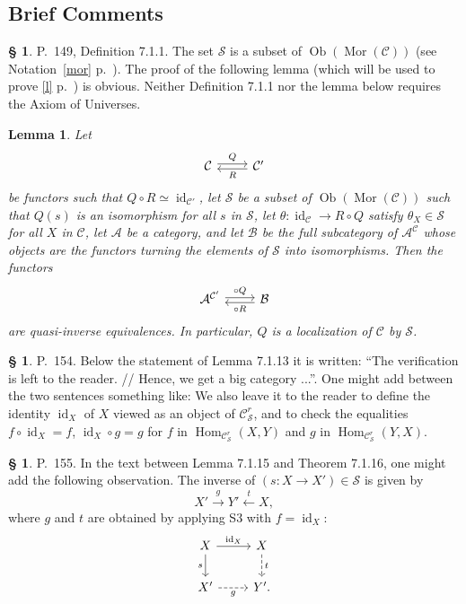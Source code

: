 \documentclass[12pt]{article}%
\newtheorem{lem}[thm]{Lemma}
\theoremstyle{remark}
\theoremstyle{definition}
\newtheorem{s}[thm]{\S}%
\newcommand{\cc}{\mathcal}
\newcommand{\A}{\mathcal A}
\newcommand{\B}{\mathcal B}
\newcommand{\C}{\mathcal C}
\newcommand{\xr}{\xrightarrow}
\DeclareMathOperator{\id}{id}
\DeclareMathOperator{\Hom}{Hom}%
\DeclareMathOperator{\Mor}{Mor}
\DeclareMathOperator{\Ob}{Ob}
\begin{document}
\subsection{Brief Comments}

\begin{s} 
P.~149, Definition 7.1.1. The set $\cc S$ is a subset of $\Ob(\Mor(\C))$ (see Notation~\ref{mor} p.~\pageref{mor}). The proof of the following lemma (which will be used to prove \eqref{l} p.~\pageref{l}) is obvious. Neither Definition 7.1.1 nor the lemma below requires the Axiom of Universes.

\begin{lem}\label{711}
Let 
$$
\begin{tikzcd}\C\ar[yshift=.5ex]{r}{Q}&\C'\ar[yshift=-.4ex]{l}{R}\end{tikzcd}
$$ 
be functors such that $Q\circ R\simeq\id_{\C'}$, let $\cc S$ be a subset of $\Ob(\Mor(\C))$ such that $Q(s)$ is an isomorphism for all $s$ in $\cc S$, let $\theta:\id_\C\to R\circ Q$ satisfy $\theta_X\in\cc S$ for all $X$ in $\C$, let $\A$ be a category, and let $\B$ be the full subcategory of $\A^\C$ whose objects are the functors turning the elements of $\cc S$ into isomorphisms. Then the functors
$$
\begin{tikzcd}\A^{\C'}\ar[yshift=.4ex]{r}{\circ Q}&\B\ar[yshift=-.5ex]{l}{\circ R}\end{tikzcd}
$$
are quasi-inverse equivalences. In particular, $Q$ is a localization of $\C$ by $\cc S$. 
\end{lem}
\end{s}

%

\begin{s} 
P.~154. Below the statement of Lemma 7.1.13 it is written: ``The verification is left to the reader. // Hence, we get a big category ...''. One might add between the two sentences something like: We also leave it to the reader to define the identity $\id_X$ of $X$ viewed as an object of $\C^r_{\mathcal S}$, and to check the equalities $f\circ\id_X=f$, $\id_X\circ g=g$ for $f$ in $\Hom_{\C^r_{\mathcal S}}(X,Y)$ and $g$ in $\Hom_{\C^r_{\mathcal S}}(Y,X)$.
\end{s}

%

\begin{s} 
P.~155. In the text between Lemma 7.1.15 and Theorem 7.1.16, one might add the following observation. The inverse of $(s:X\to X')\in\mathcal S$ is given by 
$$
X'\xr gY'\overset{t}{\leftarrow}X,
$$
where $g$ and $t$ are obtained by applying S3 with $f=\id_X$:
$$
\begin{tikzcd}
X\ar{r}{\id_X}\ar{d}[swap]{s}&X\ar[dashed]{d}{t}\\ X'\ar[dashed]{r}[swap]{g}&Y'.
\end{tikzcd}
$$
\end{s}
\end{document}
